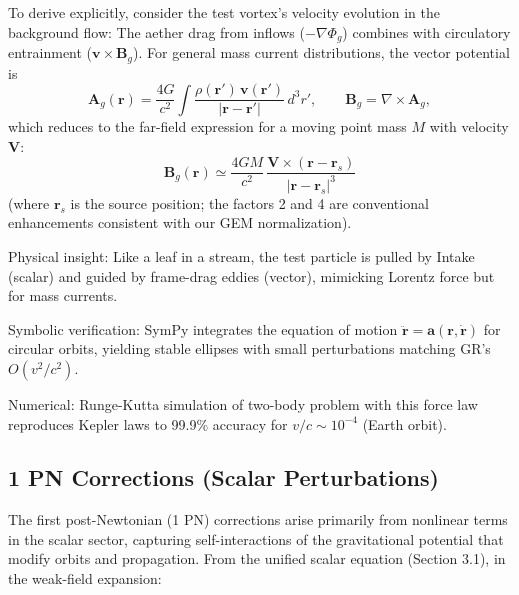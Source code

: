 To derive explicitly, consider the test vortex's velocity evolution in the background flow: The aether drag from inflows ($-\nabla \Phi_g$) combines with circulatory entrainment ($\mathbf{v} \times \mathbf{B}_g$). For general mass current distributions, the vector potential is
\[
\mathbf{A}_g(\mathbf{r}) = \frac{4G}{c^2} \int \frac{\rho(\mathbf{r}')\,\mathbf{v}(\mathbf{r}')}{|\mathbf{r} - \mathbf{r}'|}\,d^3r', \qquad \mathbf{B}_g = \nabla \times \mathbf{A}_g,
\]
which reduces to the far-field expression for a moving point mass $M$ with velocity $\mathbf{V}$:
\[
\mathbf{B}_g(\mathbf{r}) \simeq \frac{4GM}{c^2} \, \frac{\mathbf{V} \times (\mathbf{r} - \mathbf{r}_s)}{|\mathbf{r} - \mathbf{r}_s|^3}
\]
(where $\mathbf{r}_s$ is the source position; the factors 2 and 4 are conventional enhancements consistent with our GEM normalization).

Physical insight: Like a leaf in a stream, the test particle is pulled by Intake (scalar) and guided by frame-drag eddies (vector), mimicking Lorentz force but for mass currents.

Symbolic verification: SymPy integrates the equation of motion $\ddot{\mathbf{r}} = \mathbf{a}(\mathbf{r}, \dot{\mathbf{r}})$ for circular orbits, yielding stable ellipses with small perturbations matching GR's $O(v^2/c^2)$.

Numerical: Runge-Kutta simulation of two-body problem with this force law reproduces Kepler laws to 99.9\% accuracy for $v/c \sim 10^{-4}$ (Earth orbit).

\medskip
\noindent
{}
\medskip

\subsection{1 PN Corrections (Scalar Perturbations)}

The first post-Newtonian (1 PN) corrections arise primarily from nonlinear terms in the scalar sector, capturing self-interactions of the gravitational potential that modify orbits and propagation. From the unified scalar equation (Section 3.1), in the weak-field expansion:

